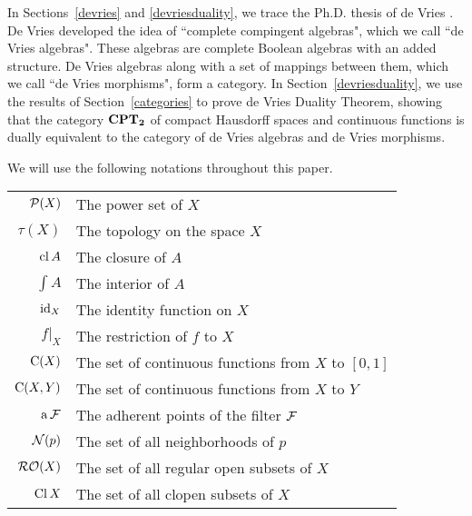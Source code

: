In Sections~\ref{devries} and \ref{devriesduality}, we trace the Ph.D. thesis of de Vries \cite{devries}.  De Vries developed the idea of ``complete compingent algebras", which we call ``de Vries algebras".  These algebras are complete Boolean algebras with an added structure.  De Vries algebras along with a set of mappings between them, which we call ``de Vries morphisms", form a category.  In Section~\ref{devriesduality}, we use the results of Section~\ref{categories} to prove de Vries Duality Theorem, showing that the category \( \bf{CPT}_\mathbf{2} \) of compact Hausdorff spaces and continuous functions is dually equivalent to the category of de Vries algebras and de Vries morphisms.

We will use the following notations throughout this paper.
\begin{center}
\begin{tabular}{rl}
	\( \mathcal{P}(X) \)	& The power set of \( X \)\\
	\( \tau(X) \)	& The topology on the space \( X \)\\
	\( \operatorname{cl}{A} \)	& The closure of \( A \)\\
	\( \int{A} \)	& The interior of \( A \)\\
	\( \operatorname{id}_X \)		& The identity function on \( X \)\\
	\( f|_X \)		& The restriction of \( f \) to \( X \)\\
	\( \operatorname{C}(X) \)		& The set of continuous functions from \( X \) to \( [0,1] \)\\
	\( \operatorname{C}(X,Y) \)	& The set of continuous functions from \( X \) to \( Y \)\\
	\( \operatorname{a}\mathcal{F} \)		& The adherent points of the filter \( \mathcal{F} \)\\
	\( \mathcal{N}(p) \)	& The set of all neighborhoods of \( p \)\\
	\( \operatorname{\mathcal{RO}}(X) \)	& The set of all regular open subsets of \( X \)\\
	\( \operatorname{Cl}{X} \)	& The set of all clopen subsets of \( X \)\\
\end{tabular}
\end{center}
